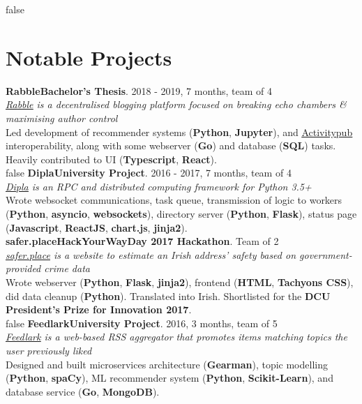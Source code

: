 \documentclass[a4paper, oneside, final]{scrartcl}
\newcommand{\nasc}[2]{\href{#1}{\color{blue}\setulcolor{blue}\ul{#2}}}
\newcommand{\bearna}[0]{\vspace{2.25mm}\\}
\newcommand{\fmtjobtitle}[1]{\textbf{#1}}
\newcommand{\fmtblurb}[1]{\textit{#1}}
\newcommand{\fmtskill}[1]{\textbf{#1}}
\begin{document}
\if false
\section{Notable Projects}
\fmtjobtitle{Rabble\hfill Bachelor's Thesis}. 2018 - 2019, 7 months, team of 4\\
\fmtblurb{\nasc{https://github.com/cpssd/rabble}{Rabble} is a decentralised blogging platform focused on breaking echo chambers \& maximising author control}\\
Led development of recommender systems (\fmtskill{Python}, \fmtskill{Jupyter}), and \nasc{http://activitypub.rocks}{Activitypub} interoperability, along with some webserver (\fmtskill{Go}) and database (\fmtskill{SQL}) tasks. Heavily contributed to UI (\fmtskill{Typescript}, \fmtskill{React}).
\bearna
\fi
\if false
\fmtjobtitle{Dipla\hfill University Project}. 2016 - 2017, 7 months, team of 4\\
\fmtblurb{\nasc{https://cpssd.net/project/dipla/}{Dipla} is an RPC and distributed computing framework for Python 3.5+}\\
Wrote websocket communications, task queue, transmission of logic to workers (\fmtskill{Python}, \fmtskill{asyncio}, \fmtskill{websockets}), directory server (\fmtskill{Python}, \fmtskill{Flask}), status page (\fmtskill{Javascript}, \fmtskill{ReactJS}, \fmtskill{chart.js}, \fmtskill{jinja2}).
\bearna
\fmtjobtitle{safer.place\hfill HackYourWayDay 2017 Hackathon}. Team of 2\\
\fmtblurb{\nasc{http://safer.place}{safer.place} is a website to estimate an Irish address’ safety based on government-provided crime data}\\
Wrote webserver (\fmtskill{Python}, \fmtskill{Flask}, \fmtskill{jinja2}), frontend (\fmtskill{HTML}, \fmtskill{Tachyons CSS}), did data cleanup (\fmtskill{Python}). Translated into Irish. Shortlisted for the \fmtskill{DCU President’s Prize for Innovation 2017}.
\bearna
\fi
\if false
\fmtjobtitle{Feedlark\hfill University Project}. 2016, 3 months, team of 5\\
\fmtblurb{\nasc{https://cpssd.net/project/feedlark/}{Feedlark} is a web-based RSS aggregator that promotes items matching topics the user previously liked}\\
Designed and built microservices architecture (\fmtskill{Gearman}), topic modelling (\fmtskill{Python}, \fmtskill{spaCy}), ML recommender system
(\fmtskill{Python}, \fmtskill{Scikit-Learn}), and database service (\fmtskill{Go}, \fmtskill{MongoDB}).
\fi
\end{document}
